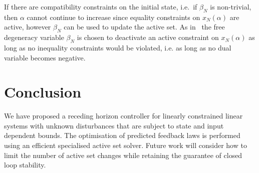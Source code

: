 \documentclass{ifacconf}
\begin{document}
If there are compatibility constraints on the initial state, i.e.\ if $\beta_N$ is non-trivial, then $\alpha$ cannot continue 
to  increase since equality constraints on $x_N(\alpha)$ are active, however $\beta_N$ can be used to update the active set. 
As in~\cite{Buerger:ACC} the free degeneracy variable $\beta_N$ is chosen to deactivate an active constraint on $x_N(\alpha)$ 
as long as no inequality constraints would be violated, i.e. as long as no dual variable becomes negative. 



\section{Conclusion}\label{sec:conclusion}
We have proposed a receding horizon controller for linearly constrained linear systems with unknown
disturbances that are subject to state and input dependent bounds. The optimisation of predicted feedback laws
is performed using an efficient specialised active set solver. Future work will consider how to limit the number of active set changes while retaining
the guarantee of closed loop stability.


\end{document}
